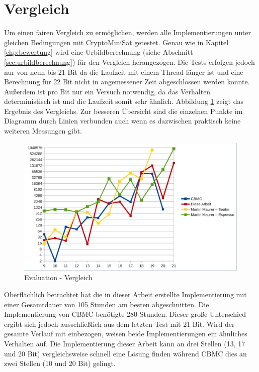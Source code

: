 \section{Vergleich}

Um einen fairen Vergleich zu ermöglichen, werden alle Implementierungen unter gleichen Bedingungen mit CryptoMiniSat
getestet. Genau wie in Kapitel \ref{chp:bewertung} wird eine Urbildberechnung (siehe Abschnitt \ref{sec:urbildberechnung})
für den Vergleich herangezogen. Die Tests erfolgen jedoch nur von neun bis 21 Bit da die Laufzeit mit einem Thread länger
ist und eine Berechnung für 22 Bit nicht in angemessener Zeit abgeschlossen werden konnte. Außerdem ist pro Bit nur ein
Versuch notwendig, da das Verhalten deterministisch ist und die Laufzeit somit sehr ähnlich. Abbildung \ref{fig:eval_final}
zeigt das Ergebnis des Vergleichs. Zur besseren Übersicht sind die einzelnen Punkte im Diagramm durch Linien verbunden auch
wenn es dazwischen praktisch keine weiteren Messungen gibt.
\begin{figure}[!h]
  \centering
  \includegraphics[scale=0.55]{images/eval_final}
  \caption{Evaluation - Vergleich}
  \label{fig:eval_final}
\end{figure}

Oberflächlich betrachtet hat die in dieser Arbeit erstellte Implementierung mit einer Gesamtdauer von 105 Stunden am besten abgeschnitten.
Die Implementierung von CBMC benötigte 280  Stunden. Dieser große Unterschied ergibt sich jedoch ausschließlich aus dem
letzten Test mit 21 Bit. Wird der gesamte Verlauf mit einbezogen, weisen beide Implementierungen ein ähnliches Verhalten auf. Die
Implementierung dieser Arbeit kann an drei Stellen (13, 17 und 20 Bit) vergleichsweise schnell eine Lösung finden während CBMC dies
an zwei Stellen (10 und 20 Bit) gelingt.

